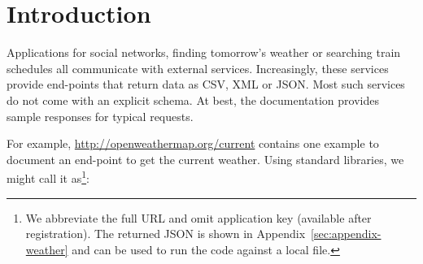 \documentclass[10pt,nocopyrightspace]{sigplanconf}
\begin{document}
%
%

\section{Introduction}
\label{sec:introduction}

Applications for social networks, finding tomorrow's weather or searching train schedules
all communicate with external services. Increasingly, these services provide end-points that return
data as CSV, XML or JSON. Most such services do not come with an explicit schema. At best, the
documentation provides sample responses for typical requests.

For example, \url{http://openweathermap.org/current} contains one example to document an end-point
to get the current weather. Using standard libraries, we might call it as\footnote{We abbreviate
the full URL and omit application key (available after registration). The returned JSON is shown
in Appendix~\ref{sec:appendix-weather} and can be used to run the code against a local file.}:
\end{document}

